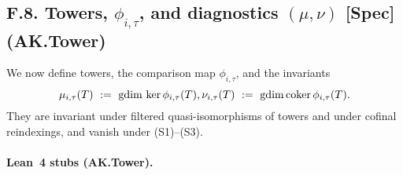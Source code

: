 \documentclass[11pt]{article}
\numberwithin{equation}{section}
\theoremstyle{plain}
\theoremstyle{definition}
\theoremstyle{remark}
\theoremstyle{plain}
\theoremstyle{definition}
\numberwithin{equation}{section}
\theoremstyle{definition}
\numberwithin{equation}{section}
\theoremstyle{plain}
\theoremstyle{definition}
\theoremstyle{remark}
\providecommand{\n}{\unskip\space}
\begin{document}
\subsection*{F.8. Towers, \(\phi_{i,\tau}\), and diagnostics \((\mu,\nu)\) [Spec] (AK.Tower)}

We now define towers, the comparison map \(\phi_{i,\tau}\), and the invariants
\[
\mu_{i,\tau}(T)\ :=\ \mathrm{gdim}\,\ker\phi_{i,\tau}(T),\qquad\n\nu_{i,\tau}(T)\ :=\ \mathrm{gdim}\,\mathrm{coker}\,\phi_{i,\tau}(T).
\]
They are invariant under filtered quasi-isomorphisms of towers and under cofinal reindexings, and vanish under (S1)–(S3).

\paragraph{Lean~4 stubs (AK.Tower).}
\end{document}
